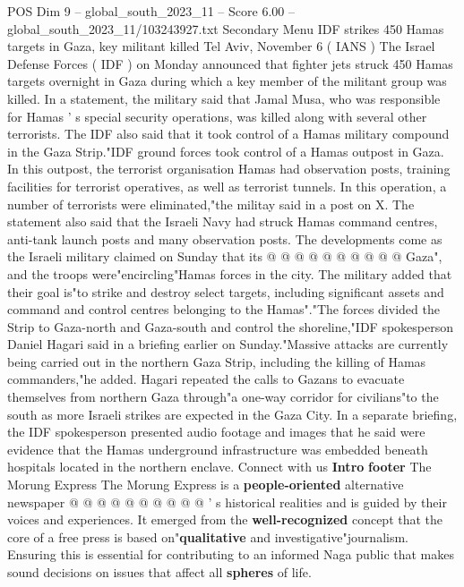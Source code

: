 \begin{textsample}{POS Dim 9 – global\_south\_2023\_11 – Score 6.00 – global\_south\_2023\_11/103243927.txt}  \label{ex:f9_pos_024}
Secondary Menu IDF strikes 450 Hamas targets in Gaza, key militant killed Tel Aviv, November 6 ( IANS ) The Israel Defense Forces ( IDF ) on Monday announced that fighter jets struck 450 Hamas targets overnight in Gaza during which a key member of the militant group was killed.
In a statement, the military said that Jamal Musa, who was responsible for Hamas ' s special security operations, was killed along with several other terrorists.
The IDF also said that it took control of a Hamas military compound in the Gaza Strip."IDF ground forces took control of a Hamas outpost in Gaza.
In this outpost, the terrorist organisation Hamas had observation posts, training facilities for terrorist operatives, as well as terrorist tunnels.
In this operation, a number of terrorists were eliminated,"the militay said in a post on X.
The statement also said that the Israeli Navy had struck Hamas command centres, anti-tank launch posts and many observation posts.
The developments come as the Israeli military claimed on Sunday that its @ @ @ @ @ @ @ @ @ @ Gaza", and the troops were"encircling"Hamas forces in the city.
The military added that their goal is"to strike and destroy select targets, including significant assets and command and control centres belonging to the Hamas"."The forces divided the Strip to Gaza-north and Gaza-south and control the shoreline,"IDF spokesperson Daniel Hagari said in a briefing earlier on Sunday."Massive attacks are currently being carried out in the northern Gaza Strip, including the killing of Hamas commanders,"he added.
Hagari repeated the calls to Gazans to evacuate themselves from northern Gaza through"a one-way corridor for civilians"to the south as more Israeli strikes are expected in the Gaza City.
In a separate briefing, the IDF spokesperson presented audio footage and images that he said were evidence that the Hamas underground infrastructure was embedded beneath hospitals located in the northern enclave.
Connect with us \textbf{Intro} \textbf{footer} The Morung Express The Morung Express is a \textbf{people-oriented} alternative newspaper @ @ @ @ @ @ @ @ @ @ ' s historical realities and is guided by their voices and experiences.
It emerged from the \textbf{well-recognized} concept that the core of a free press is based on"\textbf{qualitative} and investigative"journalism.
Ensuring this is essential for contributing to an informed Naga public that makes sound decisions on issues that affect all \textbf{spheres} of life.

\end{textsample}
